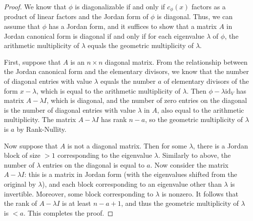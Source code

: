 \documentclass[11pt]{article}
\theoremstyle{definition}
\begin{document}
\begin{proof}
We know that $\phi$ is diagonalizable if and only if $c_\phi(x)$ factors as a product of linear factors and the Jordan form of $\phi$ is diagonal. Thus, we can assume that $\phi$ has a Jordan form, and it suffices to show that a matrix $A$ in Jordan canonical form is diagonal if and only if for each eigenvalue $\lambda$ of $\phi$, the arithmetic multiplicity of $\lambda$ equals the geometric multiplicity of $\lambda$.

First, suppose that $A$ is an $n\times n$ diagonal matrix. From the relationship between the Jordan canonical form and the elementary divisors, we know that the number of diagonal entries with value $\lambda$ equals the number $a$ of elementary divisors of the form $x-\lambda$, which is equal to the arithmetic multiplicity of $\lambda$. Then $\phi-\lambda \mathrm{id}_V$ has matrix $A-\lambda I$, which is diagonal, and the number of zero entries on the diagonal is the number of diagonal entries with value $\lambda$ in $A$, also equal to the arithmetic multiplicity. The matrix $A-\lambda I$ has rank $n-a$, so the geometric multiplicity of $\lambda$ is $a$ by Rank-Nullity.


Now suppose that $A$ is not a diagonal matrix. Then for some $\lambda$, there is a Jordan block of size $>1$ corresponding to the eigenvalue $\lambda$. Similarly to above, the number of $\lambda$ entries on the diagonal is equal to $a$. Now consider the matrix $A-\lambda I$: this is a matrix in Jordan form (with the eigenvalues shifted from the original by $\lambda$), and each block corresponding to an eigenvalue other than $\lambda$ is invertible. Moreover, some block corresponding to $\lambda$ is nonzero. It follows that the rank of $A-\lambda I$ is at least $n-a+1$, and thus the geometric multiplicity of $\lambda$ is $<a$. This completes the proof.
\end{proof}
\end{document}
